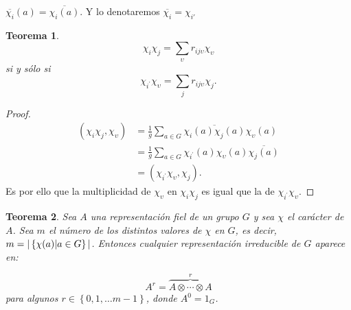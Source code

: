 \documentclass[12pt]{book}
\newtheorem{theorem}{Teorema}[section]
\theoremstyle{definition}
\newcounter{in}
\begin{document}
$\overline{\chi_{i}}(a) = \overline{\chi_{i}(a)}$. Y lo denotaremos
$\overline{\chi_{i}}=\chi_{i'}$
\begin{theorem}
  \label{t6_2}
\begin{equation*}
  \chi_{i} \chi_{j} = \sum_{\upsilon} r_{ij \upsilon} \chi_{\upsilon}
\end{equation*}
si y sólo si
\begin{equation*}
  \chi_{i^{'}}\chi_{\upsilon} =  \sum_{j} r_{ij \upsilon} \chi_{j}.
\end{equation*}
\end{theorem}
\begin{proof}
  \begin{equation}
    \label{eq:5}
    \begin{aligned}
      (\chi_{i} \chi_{j}, \chi_{\upsilon}) &= \frac{1}{g} \sum_{a \in G} \overline{\chi_{i}(a) \chi_{j}(a)} \chi_{\upsilon}(a) \\
      & = \frac{1}{g} \sum_{a \in G} \chi_{i^{'}}(a) \chi_{\upsilon}(a) \overline{\chi_{j}(a)} \\
      & = (\chi_{i^{'}} \chi_{\upsilon},\chi_{j}).
    \end{aligned}
  \end{equation}
  Es por ello que la multiplicidad de $\chi_{\upsilon}$ en
  $\chi_{i} \chi_{j}$ es igual que la de
  $\chi_{i^{'}} \chi_{\upsilon}$.  
\end{proof}
\begin{theorem}
  \label{t6_3}
  Sea $A$ una representación fiel de un grupo $G$ y sea $\chi$ el
  carácter de $A$. Sea $m$ el número de los distintos valores de
  $\chi$ en $G$, es
  decir,~$m = |\left\{ \chi(a) \arrowvert a \in G \right\}
  |$. Entonces cualquier representación irreducible de $G$ aparece en:

  \begin{equation*}
    A^{r}=  \overbrace{A \otimes \cdots \otimes A}^{r}
  \end{equation*}
  para algunos $r \in \left\{ 0, 1, \ldots m-1 \right\}$, donde $A^{0}=1_{G}$.
\end{theorem}
\end{document}
